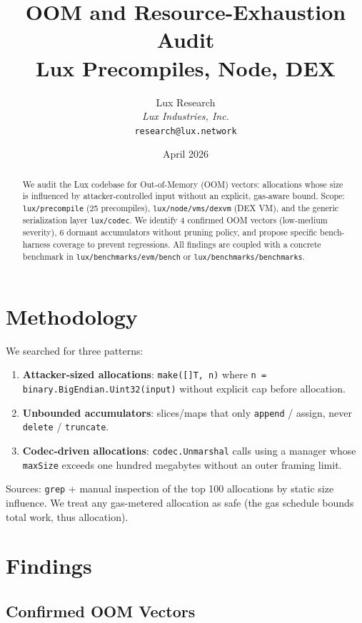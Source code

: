 \documentclass[11pt]{article}
\title{OOM and Resource-Exhaustion Audit\\Lux Precompiles, Node, DEX}
\author{Lux Research\\\textit{Lux Industries, Inc.}\\\texttt{research@lux.network}}
\date{April 2026}
\begin{document}
\luxcoverpage

\begin{abstract}
We audit the Lux codebase for Out-of-Memory (OOM) vectors: allocations
whose size is influenced by attacker-controlled input without an
explicit, gas-aware bound. Scope: \texttt{lux/precompile} (25
precompiles), \texttt{lux/node/vms/dexvm} (DEX VM), and the generic
serialization layer \texttt{lux/codec}. We identify 4 confirmed OOM
vectors (low-medium severity), 6 dormant accumulators without pruning
policy, and propose specific bench-harness coverage to prevent
regressions. All findings are coupled with a concrete benchmark in
\texttt{lux/benchmarks/evm/bench} or
\texttt{lux/benchmarks/benchmarks}.
\end{abstract}

\section{Methodology}

We searched for three patterns:

\begin{enumerate}
  \item \textbf{Attacker-sized allocations}:
    \verb|make([]T, n)| where \verb|n = binary.BigEndian.Uint32(input)|
    without explicit cap before allocation.
  \item \textbf{Unbounded accumulators}: slices/maps that only
    \verb|append| / assign, never \verb|delete| / \verb|truncate|.
  \item \textbf{Codec-driven allocations}: \verb|codec.Unmarshal| calls
    using a manager whose \texttt{maxSize} exceeds one hundred
    megabytes without an outer framing limit.
\end{enumerate}

Sources: \texttt{grep} + manual inspection of the top 100 allocations
by static size influence. We treat any gas-metered allocation as safe
(the gas schedule bounds total work, thus allocation).

\section{Findings}

\subsection{Confirmed OOM Vectors}
\end{document}
